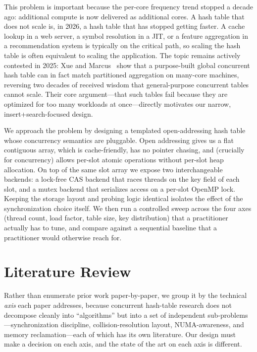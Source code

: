 \documentclass[10pt,twocolumn]{article}
\begin{document}
This problem is important because the per-core frequency trend stopped
a decade ago: additional compute is now delivered as additional cores.
A hash table that does not scale is, in 2026, a hash table that has
stopped getting faster. A cache lookup in a web server, a symbol
resolution in a JIT, or a feature aggregation in a recommendation
system is typically on the critical path, so scaling the hash table is
often equivalent to scaling the application. The topic remains
actively contested in 2025: Xue and Marcus~\cite{xue2025global} show
that a purpose-built global concurrent hash table can in fact match
partitioned aggregation on many-core machines, reversing two decades
of received wisdom that general-purpose concurrent tables cannot
scale. Their core argument---that such tables fail because they are
optimized for too many workloads at once---directly motivates our
narrow, insert+search-focused design.

We approach the problem by designing a templated open-addressing hash
table whose concurrency semantics are pluggable. Open addressing gives
us a flat contiguous array, which is cache-friendly, has no pointer
chasing, and (crucially for concurrency) allows per-slot atomic
operations without per-slot heap allocation. On top of the same slot
array we expose two interchangeable backends: a lock-free CAS backend
that races threads on the key field of each slot, and a mutex backend
that serializes access on a per-slot OpenMP lock. Keeping the storage
layout and probing logic identical isolates the effect of the
synchronization choice itself. We then run a controlled sweep across
the four axes (thread count, load factor, table size, key
distribution) that a practitioner actually has to tune, and compare
against a sequential baseline that a practitioner would otherwise
reach for.

\section{Literature Review}
Rather than enumerate prior work paper-by-paper, we group it by the
technical \emph{axis} each paper addresses, because concurrent
hash-table research does not decompose cleanly into ``algorithms''
but into a set of independent sub-problems---synchronization
discipline, collision-resolution layout, NUMA-awareness, and memory
reclamation---each of which has its own literature. Our design must
make a decision on each axis, and the state of the art on each axis
is different.
\end{document}
